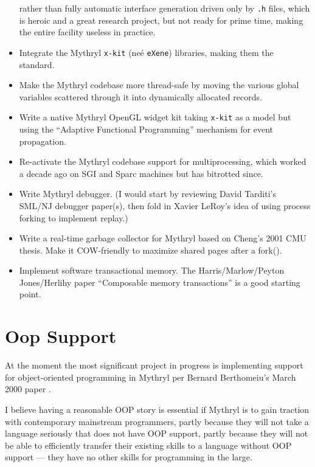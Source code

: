 \begin{itemize}
      rather than fully automatic interface generation driven only by {\tt .h} files, which is heroic and a great research project, but not ready for prime time, making 
      the entire facility useless in practice.
\item Integrate the Mythryl {\tt x-kit} (ne\'e {\tt eXene}) libraries, making them the standard.
\item Make the Mythryl codebase more thread-safe by moving the various global variables scattered through it into dynamically allocated records.
\item Write a native Mythryl OpenGL widget kit taking {\tt x-kit} as a model but using the ``Adaptive Functional Programming'' mechanism for event propagation.
\item Re-activate the Mythryl codebase support for multiprocessing, which worked a decade ago on SGI and Sparc machines but has bitrotted since.
\item Write Mythryl debugger.  (I would start by reviewing David Tarditi's SML/NJ debugger paper(s), then fold in Xavier LeRoy's idea of using process forking to implement replay.)
\item Write a real-time garbage collector for Mythryl based on Cheng's 2001 CMU thesis.  Make it {\sc COW}-friendly to maximize shared pages after a fork().
\item Implement software transactional memory.  The Harris/Marlow/Peyton Jones/Herlihy paper ``Composable memory transactions'' is a good starting point.
\end{itemize}

\section{Oop Support}

At the moment the most significant project in progress is implementing 
support for object-oriented programming in Mythryl per Bernard Berthomeiu's 
March 2000 paper .

I believe having a reasonable OOP story is essential if Mythryl is to 
gain traction with contemporary mainstream programmers, partly because 
they will not take a language seriously that does not have OOP support, 
partly because they will not be able to efficiently transfer their 
existing skills to a language without OOP support --- they have no other 
skills for programming in the large.

